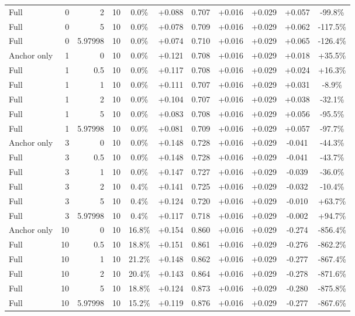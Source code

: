 \begin{table}[htbp]
\begin{tabular}{lrrrccccccc}
Full & 0 & 2 & 10 & 0.0\% & +0.088 & 0.707 & +0.016 & +0.029 & +0.057 & -99.8\% \\
Full & 0 & 5 & 10 & 0.0\% & +0.078 & 0.709 & +0.016 & +0.029 & +0.062 & -117.5\% \\
Full & 0 & 5.97998 & 10 & 0.0\% & +0.074 & 0.710 & +0.016 & +0.029 & +0.065 & -126.4\% \\
Anchor only & 1 & 0 & 10 & 0.0\% & +0.121 & 0.708 & +0.016 & +0.029 & +0.018 & +35.5\% \\
Full & 1 & 0.5 & 10 & 0.0\% & +0.117 & 0.708 & +0.016 & +0.029 & +0.024 & +16.3\% \\
Full & 1 & 1 & 10 & 0.0\% & +0.111 & 0.707 & +0.016 & +0.029 & +0.031 & -8.9\% \\
Full & 1 & 2 & 10 & 0.0\% & +0.104 & 0.707 & +0.016 & +0.029 & +0.038 & -32.1\% \\
Full & 1 & 5 & 10 & 0.0\% & +0.083 & 0.708 & +0.016 & +0.029 & +0.056 & -95.5\% \\
Full & 1 & 5.97998 & 10 & 0.0\% & +0.081 & 0.709 & +0.016 & +0.029 & +0.057 & -97.7\% \\
Anchor only & 3 & 0 & 10 & 0.0\% & +0.148 & 0.728 & +0.016 & +0.029 & -0.041 & -44.3\% \\
Full & 3 & 0.5 & 10 & 0.0\% & +0.148 & 0.728 & +0.016 & +0.029 & -0.041 & -43.7\% \\
Full & 3 & 1 & 10 & 0.0\% & +0.147 & 0.727 & +0.016 & +0.029 & -0.039 & -36.0\% \\
Full & 3 & 2 & 10 & 0.4\% & +0.141 & 0.725 & +0.016 & +0.029 & -0.032 & -10.4\% \\
Full & 3 & 5 & 10 & 0.4\% & +0.124 & 0.720 & +0.016 & +0.029 & -0.010 & +63.7\% \\
Full & 3 & 5.97998 & 10 & 0.4\% & +0.117 & 0.718 & +0.016 & +0.029 & -0.002 & +94.7\% \\
Anchor only & 10 & 0 & 10 & 16.8\% & +0.154 & 0.860 & +0.016 & +0.029 & -0.274 & -856.4\% \\
Full & 10 & 0.5 & 10 & 18.8\% & +0.151 & 0.861 & +0.016 & +0.029 & -0.276 & -862.2\% \\
Full & 10 & 1 & 10 & 21.2\% & +0.148 & 0.862 & +0.016 & +0.029 & -0.277 & -867.4\% \\
Full & 10 & 2 & 10 & 20.4\% & +0.143 & 0.864 & +0.016 & +0.029 & -0.278 & -871.6\% \\
Full & 10 & 5 & 10 & 18.8\% & +0.124 & 0.873 & +0.016 & +0.029 & -0.280 & -875.8\% \\
Full & 10 & 5.97998 & 10 & 15.2\% & +0.119 & 0.876 & +0.016 & +0.029 & -0.277 & -867.6\% \\

\end{tabular}
\end{table}
